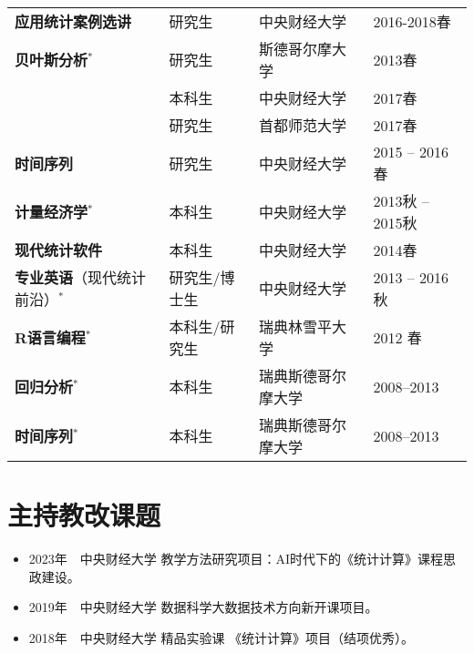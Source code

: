 \documentclass[twoside,a4paper,11pt]{article}
\begin{document}
\begin{center}
{\begin{tabular}{llll}
      \textbf{应用统计案例选讲}                 & 研究生           & 中央财经大学                   & 2016-2018春      \\
      \textbf{贝叶斯分析}$^*$                   & 研究生           & 斯德哥尔摩大学                 & 2013春           \\
                                                & 本科生           & 中央财经大学                   & 2017春           \\
                                                & 研究生           & 首都师范大学                   & 2017春           \\
      \textbf{时间序列}                         & 研究生           & 中央财经大学                   & 2015 -- 2016春   \\
      \textbf{计量经济学}$^*$                   & 本科生           & 中央财经大学                   & 2013秋 -- 2015秋 \\
      \textbf{现代统计软件}                     & 本科生           & 中央财经大学                   & 2014春           \\
      \textbf{专业英语}（现代统计前沿）$^*$     & 研究生/博士生    & 中央财经大学                   & 2013 -- 2016秋   \\
      \textbf{R语言编程}$^*$                    & 本科生/研究生    & 瑞典林雪平大学                 & 2012 春          \\
      \textbf{回归分析}$^*$                     & 本科生           & 瑞典斯德哥尔摩大学             & 2008--2013       \\
      \textbf{时间序列}$^*$                     & 本科生           & 瑞典斯德哥尔摩大学             & 2008--2013       \\
      \bottomrule
    \end{tabular}
  }
\end{center}

\section{主持教改课题}

\begin{itemize}
\item 2023年~~中央财经大学 教学方法研究项目：AI时代下的《统计计算》课程思政建设。
\item 2019年~~中央财经大学 数据科学大数据技术方向新开课项目。
\item 2018年~~中央财经大学 精品实验课 《统计计算》项目（结项优秀）。
\end{itemize}
\end{document}
